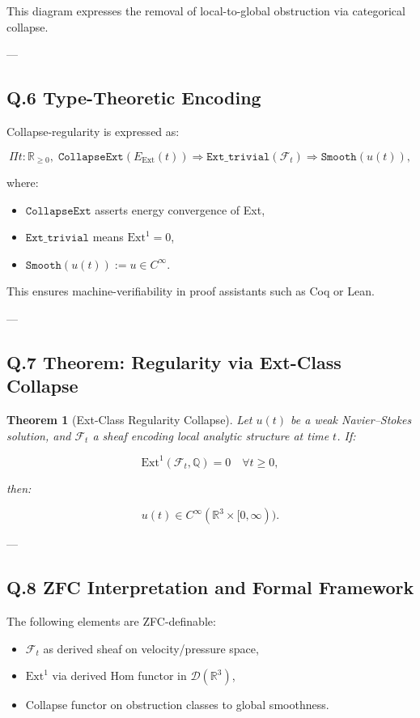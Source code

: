 \documentclass[11pt]{article}
\newtheorem{theorem}{Theorem}[section]
\begin{document}
{This diagram expresses the removal of local-to-global obstruction via categorical collapse.

---

\subsection*{Q.6 Type-Theoretic Encoding}

Collapse-regularity is expressed as:

\[
\Pi t : \mathbb{R}_{\ge 0},\;
\texttt{CollapseExt}(E_{\mathrm{Ext}}(t)) \Rightarrow
\texttt{Ext\_trivial}(\mathcal{F}_t)
\Rightarrow \texttt{Smooth}(u(t)),
\]

where:
\begin{itemize}
  \item $\texttt{CollapseExt}$ asserts energy convergence of Ext,
  \item $\texttt{Ext\_trivial}$ means $\mathrm{Ext}^1 = 0$,
  \item $\texttt{Smooth}(u(t)) := u \in C^\infty$.
\end{itemize}

This ensures machine-verifiability in proof assistants such as Coq or Lean.

---

\subsection*{Q.7 Theorem: Regularity via Ext-Class Collapse}

\begin{theorem}[Ext-Class Regularity Collapse]
Let $u(t)$ be a weak Navier–Stokes solution, and $\mathcal{F}_t$ a sheaf encoding local analytic structure at time $t$.  
If:

\[
\mathrm{Ext}^1(\mathcal{F}_t, \mathbb{Q}) = 0 \quad \forall t \ge 0,
\]

then:

\[
u(t) \in C^\infty(\mathbb{R}^3 \times [0, \infty)).
\]
\end{theorem}

---

\subsection*{Q.8 ZFC Interpretation and Formal Framework}

The following elements are ZFC-definable:
\begin{itemize}
  \item $\mathcal{F}_t$ as derived sheaf on velocity/pressure space,
  \item $\mathrm{Ext}^1$ via derived Hom functor in $\mathcal{D}(\mathbb{R}^3)$,
  \item Collapse functor on obstruction classes to global smoothness.
\end{itemize}

}
\end{document}
